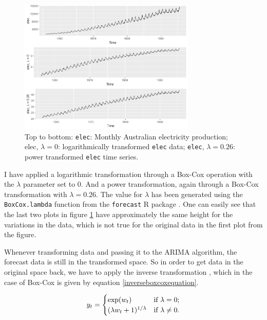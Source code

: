 \documentclass[12pt,a4paper,titlepage]{report}
\begin{document}
\begin{figure}[h]
    \centering
    \includegraphics[width=0.75\textwidth]{dboxcoxelec}
    \caption{Top to bottom: \texttt{elec}: Monthly Australian electricity production; elec, $ \lambda = 0 $: logarithmically transformed \texttt{elec} data; \texttt{elec}, $ \lambda = 0.26 $: power transformed \texttt{elec} time series.}
    \label{boxcoxelec}
\end{figure}

I have applied a logarithmic transformation through a Box-Cox operation with the $ \lambda $ parameter set to $ 0 $. And a power transformation, again through a Box-Cox transformation with $ \lambda = 0.26 $. The value for $ \lambda$ has been generated using the \texttt{BoxCox.lambda} function from the \texttt{forecast} R package \cite{fpp2transformations} \cite{rforecastpackage}. One can easily see that the last two plots in figure \ref{boxcoxelec} have approximately the same height for the variations in the data, which is not true for the original data in the first plot from the figure.

Whenever transforming data and passing it to the ARIMA algorithm, the forecast data is still in the transformed space. So in order to get data in the original space back, we have to apply the inverse transformation \cite{fpp2transformations}, which in the case of Box-Cox is given by equation \ref{inverseboxcoxequation}.

\begin{equation}
y_{t} =
\begin{cases}
\exp(w_{t}) & \text{if $ \lambda = 0 $};\\
(\lambda w_t+1)^{1/\lambda} & \text{if $ \lambda \ne 0 $}.
\end{cases}
\label{inverseboxcoxequation}
\end{equation}
\end{document}
